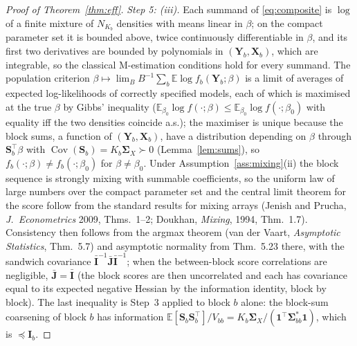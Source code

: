 \documentclass[11pt]{article}
\theoremstyle{definition}
\newcommand{\bX}{\mathbf{X}}
\newcommand{\bY}{\mathbf{Y}}
\newcommand{\bS}{\mathbf{S}}
\newcommand{\bone}{\mathbf{1}}
\newcommand{\bSig}{\boldsymbol{\Sigma}}
\newcommand{\E}{\mathbb{E}}
\newcommand{\Cov}{\operatorname{Cov}}
\begin{document}
\begin{proof}[Proof of Theorem~\ref{thm:eff}]
\emph{Step 5: (iii).} Each summand of \eqref{eq:composite} is $\log$ of a finite mixture of $N_{K_b}$ densities with means linear in $\beta$; on the compact parameter set it is bounded above, twice continuously differentiable in $\beta$, and its first two derivatives are bounded by polynomials in $(\bY_b,\bX_b)$, which are integrable, so the classical M-estimation conditions hold for every summand. The population criterion $\beta\mapsto\lim_BB^{-1}\sum_b\E\log f_b(\bY_b;\beta)$ is a limit of averages of expected log-likelihoods of correctly specified models, each of which is maximised at the true $\beta$ by Gibbs' inequality ($\E_{\beta_0}\log f(\cdot;\beta)\le\E_{\beta_0}\log f(\cdot;\beta_0)$ with equality iff the two densities coincide a.s.); the maximiser is unique because the block sums, a function of $(\bY_b,\bX_b)$, have a distribution depending on $\beta$ through $\bS_b^\top\beta$ with $\Cov(\bS_b)=K_b\bSig_X\succ0$ (Lemma~\ref{lem:sums}), so $f_b(\cdot;\beta)\ne f_b(\cdot;\beta_0)$ for $\beta\ne\beta_0$. Under Assumption~\ref{ass:mixing}(ii) the block sequence is strongly mixing with summable coefficients, so the uniform law of large numbers over the compact parameter set and the central limit theorem for the score follow from the standard results for mixing arrays (Jenish and Prucha, \emph{J.\ Econometrics} 2009, Thms.~1--2; Doukhan, \emph{Mixing}, 1994, Thm.~1.7). Consistency then follows from the argmax theorem (van der Vaart, \emph{Asymptotic Statistics}, Thm.~5.7) and asymptotic normality from Thm.~5.23 there, with the sandwich covariance $\bar{\mathbf I}^{-1}\bar{\mathbf J}\bar{\mathbf I}^{-1}$; when the between-block score correlations are negligible, $\bar{\mathbf J}=\bar{\mathbf I}$ (the block scores are then uncorrelated and each has covariance equal to its expected negative Hessian by the information identity, block by block). The last inequality is Step~3 applied to block $b$ alone: the block-sum coarsening of block $b$ has information $\E[\bS_b\bS_b^\top]/V_{bb}=K_b\bSig_X/(\bone^\top\bSig^\ast_{bb}\bone)$, which is $\preceq\mathbf I_b$.
\end{proof}
\end{document}
